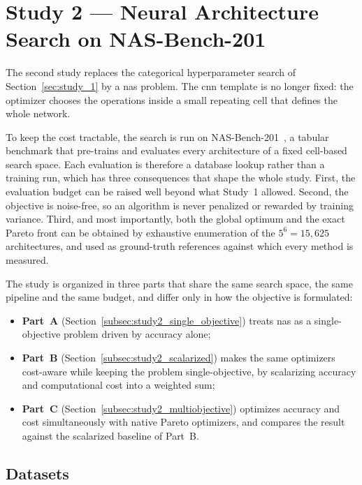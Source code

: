 \clearpage
\section{Study 2 --- Neural Architecture Search on NAS-Bench-201}
\label{sec:study_2}

The second study replaces the categorical hyperparameter search of Section~\ref{sec:study_1} by a \acrfull{nas} problem. The \acrshort{cnn} template is no longer fixed: the optimizer chooses the operations inside a small repeating cell that defines the whole network.

To keep the cost tractable, the search is run on NAS-Bench-201~\cite{dong2020nasbench201}, a tabular benchmark that pre-trains and evaluates every architecture of a fixed cell-based search space. Each evaluation is therefore a database lookup rather than a training run, which has three consequences that shape the whole study. First, the evaluation budget can be raised well beyond what Study~1 allowed. Second, the objective is noise-free, so an algorithm is never penalized or rewarded by training variance. Third, and most importantly, both the global optimum and the exact Pareto front can be obtained by exhaustive enumeration of the $5^6 = 15{,}625$ architectures, and used as ground-truth references against which every method is measured.

The study is organized in three parts that share the same search space, the same pipeline and the same budget, and differ only in how the objective is formulated:

\begin{itemize}
    \item \textbf{Part~A} (Section~\ref{subsec:study2_single_objective}) treats \acrshort{nas} as a single-objective problem driven by accuracy alone;
    \item \textbf{Part~B} (Section~\ref{subsec:study2_scalarized}) makes the same optimizers cost-aware while keeping the problem single-objective, by scalarizing accuracy and computational cost into a weighted sum;
    \item \textbf{Part~C} (Section~\ref{subsec:study2_multiobjective}) optimizes accuracy and cost simultaneously with native Pareto optimizers, and compares the result against the scalarized baseline of Part~B.
\end{itemize}

\subsection{Datasets}
\label{subsec:study2_datasets}

